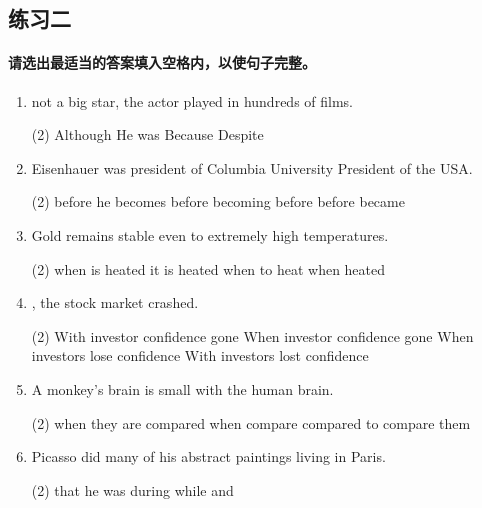 \subsection{练习二}

\paragraph{请选出最适当的答案填入空格内，以使句子完整。}

\begin{enumerate}
\item \ttu not a big star, the actor played in hundreds of films.
\begin{tasks}(2)
  \task Although
  \task He was
  \task Because
  \task Despite
\end{tasks}

\item Eisenhauer was president of Columbia University \ttu President of the USA.
\begin{tasks}(2)
  \task before he becomes
  \task before becoming
  \task before
  \task before became
\end{tasks}

\item Gold remains stable even \ttu to extremely high temperatures.
\begin{tasks}(2)
  \task when is heated
  \task it is heated
  \task when to heat
  \task when heated
\end{tasks}

\item \ttu, the stock market crashed.
\begin{tasks}(2)
  \task With investor confidence gone
  \task When investor confidence gone
  \task When investors lose confidence
  \task With investors lost confidence
\end{tasks}

\item A monkey's brain is small \ttu with the human brain.
\begin{tasks}(2)
  \task when they are compared
  \task when compare
  \task compared
  \task to compare them
\end{tasks}

\item Picasso did many of his abstract paintings \ttu living in Paris.
\begin{tasks}(2)
  \task that he was
  \task during
  \task while
  \task and
\end{tasks}


\end{enumerate}

